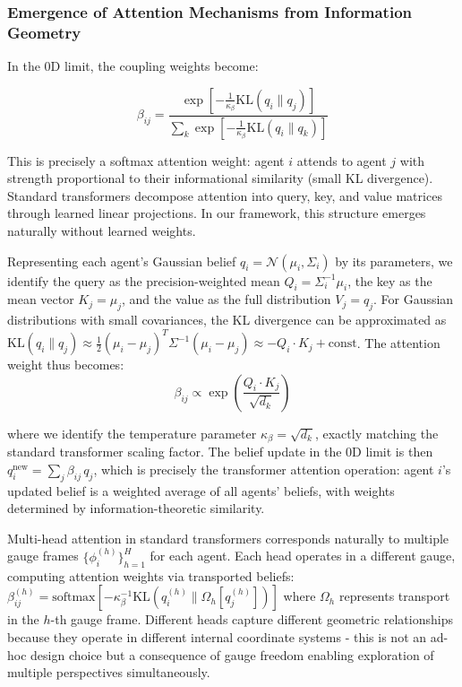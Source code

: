 \documentclass[11pt]{article}
\begin{document}
\subsubsection{Emergence of Attention Mechanisms from Information Geometry}

In the 0D limit, the coupling weights become:

\begin{equation}
\beta_{ij} = \frac{\exp\left[-\frac{1}{\kappa_\beta}\mathrm{KL}(q_i \| q_j)\right]}{\sum_k \exp\left[-\frac{1}{\kappa_\beta}\mathrm{KL}(q_i \| q_k)\right]}
\end{equation}

This is precisely a softmax attention weight: agent $i$ attends to agent $j$ with strength proportional to their informational similarity (small KL divergence). Standard transformers decompose attention into query, key, and value matrices through learned linear projections. In our framework, this structure emerges naturally without learned weights.

Representing each agent's Gaussian belief $q_i = \mathcal{N}(\mu_i, \Sigma_i)$ by its parameters, we identify the query as the precision-weighted mean $Q_i = \Sigma_i^{-1}\mu_i$, the key as the mean vector $K_j = \mu_j$, and the value as the full distribution $V_j = q_j$. For Gaussian distributions with small covariances, the KL divergence can be approximated as $\mathrm{KL}(q_i \| q_j) \approx \frac{1}{2}(\mu_i - \mu_j)^T \Sigma^{-1} (\mu_i - \mu_j) \approx -Q_i \cdot K_j + \text{const}$. The attention weight thus becomes:
\begin{equation}
\beta_{ij} \propto \exp\left(\frac{Q_i \cdot K_j}{\sqrt{d_k}}\right)
\end{equation}

where we identify the temperature parameter $\kappa_\beta = \sqrt{d_k}$, exactly matching the standard transformer scaling factor. The belief update in the 0D limit is then $q_i^{\mathrm{new}} = \sum_j \beta_{ij} \, q_j$, which is precisely the transformer attention operation: agent $i$'s updated belief is a weighted average of all agents' beliefs, with weights determined by information-theoretic similarity.

Multi-head attention in standard transformers corresponds naturally to multiple gauge frames $\{\phi_i^{(h)}\}_{h=1}^H$ for each agent. Each head operates in a different gauge, computing attention weights via transported beliefs: $\beta_{ij}^{(h)} = \mathrm{softmax}[-\kappa_\beta^{-1} \mathrm{KL}(q_i^{(h)} \| \Omega_h[q_j^{(h)}])]$ where $\Omega_h$ represents transport in the $h$-th gauge frame. Different heads capture different geometric relationships because they operate in different internal coordinate systems - this is not an ad-hoc design choice but a consequence of gauge freedom enabling exploration of multiple perspectives simultaneously.
\end{document}
